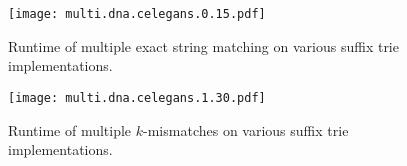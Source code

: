 \begin{figure}[h]
\begin{center}
\caption[Multiple exact string matching runtime]{Runtime of multiple exact string matching on various suffix trie implementations.}
\label{fig:query-dna-exact-multi}
\texttt{[image: multi.dna.celegans.0.15.pdf]}
\end{center}
\end{figure}

\begin{figure}[h]
\begin{center}
\caption[Multiple $k$-mismatches runtime]{Runtime of multiple $k$-mismatches on various suffix trie implementations.}
\label{fig:query-dna-apx-multi}
\texttt{[image: multi.dna.celegans.1.30.pdf]}
\end{center}
\end{figure}

